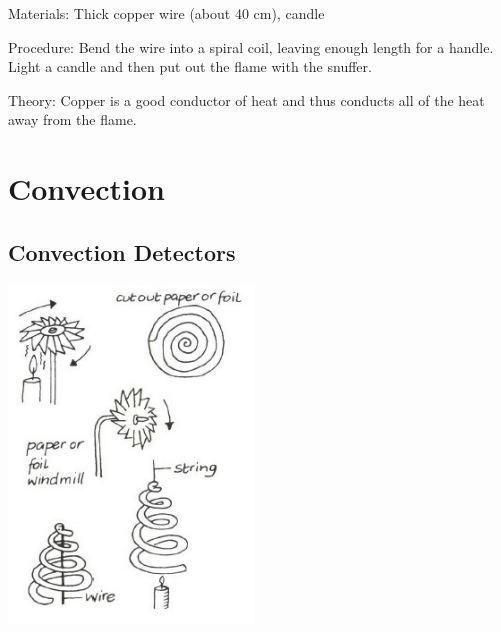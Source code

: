 \begin{multicols}{2}
\begin{description*}
\item[Materials:]{Thick copper wire (about 40 cm), candle}
\item[Procedure:]{Bend the wire into a spiral coil, leaving enough length for a handle. Light a candle and then put out the flame with the snuffer.}
\item[Theory:]{Copper is a good conductor of heat and thus conducts all of the heat away from the flame.}
\end{description*}


\section*{Convection}


\subsection{Convection Detectors}

\begin{center}
\includegraphics[width=0.49\textwidth]{./img/vso/convection-detectors.jpg}
\end{center}


\end{multicols}
